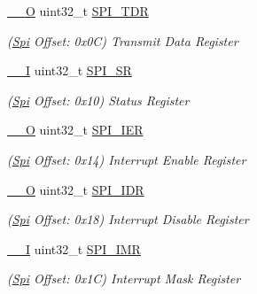 \begin{DoxyCompactItemize}
\mbox{\hyperlink{core__cm7_8h_a7e25d9380f9ef903923964322e71f2f6}{\+\_\+\+\_\+O}} uint32\+\_\+t \mbox{\hyperlink{structSpi_a8c8f55ee122f6b0ad33d438a4f1ff1ef}{S\+P\+I\+\_\+\+T\+DR}}
\begin{DoxyCompactList}\small\item\em (\mbox{\hyperlink{structSpi}{Spi}} Offset\+: 0x0C) Transmit Data Register \end{DoxyCompactList}\item 
\mbox{\label{structSpi_ae1f91a373e95428f2e2b1d6bfab333b2}} 
\mbox{\hyperlink{core__cm7_8h_af63697ed9952cc71e1225efe205f6cd3}{\+\_\+\+\_\+I}} uint32\+\_\+t \mbox{\hyperlink{structSpi_ae1f91a373e95428f2e2b1d6bfab333b2}{S\+P\+I\+\_\+\+SR}}
\begin{DoxyCompactList}\small\item\em (\mbox{\hyperlink{structSpi}{Spi}} Offset\+: 0x10) Status Register \end{DoxyCompactList}\item 
\mbox{\label{structSpi_a2cde5578804cb090b599fe07eeaa04d4}} 
\mbox{\hyperlink{core__cm7_8h_a7e25d9380f9ef903923964322e71f2f6}{\+\_\+\+\_\+O}} uint32\+\_\+t \mbox{\hyperlink{structSpi_a2cde5578804cb090b599fe07eeaa04d4}{S\+P\+I\+\_\+\+I\+ER}}
\begin{DoxyCompactList}\small\item\em (\mbox{\hyperlink{structSpi}{Spi}} Offset\+: 0x14) Interrupt Enable Register \end{DoxyCompactList}\item 
\mbox{\label{structSpi_a8c8575c6d9cf819ce6aff62ea79276eb}} 
\mbox{\hyperlink{core__cm7_8h_a7e25d9380f9ef903923964322e71f2f6}{\+\_\+\+\_\+O}} uint32\+\_\+t \mbox{\hyperlink{structSpi_a8c8575c6d9cf819ce6aff62ea79276eb}{S\+P\+I\+\_\+\+I\+DR}}
\begin{DoxyCompactList}\small\item\em (\mbox{\hyperlink{structSpi}{Spi}} Offset\+: 0x18) Interrupt Disable Register \end{DoxyCompactList}\item 
\mbox{\label{structSpi_a9b25e67749c807004595f3301c65b9ad}} 
\mbox{\hyperlink{core__cm7_8h_af63697ed9952cc71e1225efe205f6cd3}{\+\_\+\+\_\+I}} uint32\+\_\+t \mbox{\hyperlink{structSpi_a9b25e67749c807004595f3301c65b9ad}{S\+P\+I\+\_\+\+I\+MR}}
\begin{DoxyCompactList}\small\item\em (\mbox{\hyperlink{structSpi}{Spi}} Offset\+: 0x1C) Interrupt Mask Register \end{DoxyCompactList}\item 

\end{DoxyCompactItemize}

